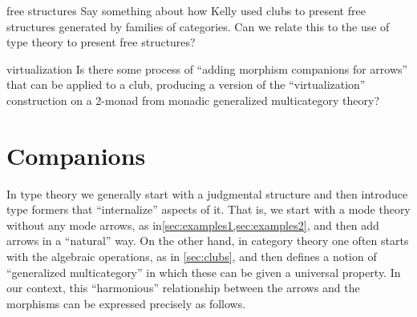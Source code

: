\documentclass{article}
\theoremstyle{definition}
\theoremstyle{remark}
\begin{document}
\begin{anfxnote}{free structures}
  Say something about how Kelly used clubs to present free structures generated by families of categories.
  Can we relate this to the use of type theory to present free structures?
\end{anfxnote}

\begin{anfxnote}{virtualization}
  Is there some process of ``adding morphism companions for arrows'' that can be applied to a club, producing a version of the ``virtualization'' construction on a 2-monad from monadic generalized multicategory theory?
\end{anfxnote}


\section{Companions}
\label{sec:companions}

In type theory we generally start with a judgmental structure and then introduce type formers that ``internalize'' aspects of it.
That is, we start with a mode theory without any mode arrows, as in\cref{sec:examples1,sec:examples2}, and then add arrows in a ``natural'' way.
On the other hand, in category theory one often starts with the algebraic operations, as in \cref{sec:clubs}, and then defines a notion of ``generalized multicategory'' in which these can be given a universal property.
In our context, this ``harmonious'' relationship between the arrows and the morphisms can be expressed precisely as follows.
\end{document}
